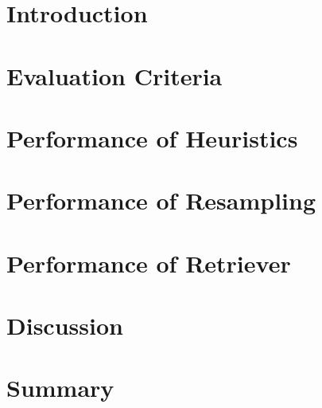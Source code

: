 \section*{Introduction}
\label{sec:evaluation:introduction}



\section{Evaluation Criteria}
\label{sec:evaluation:rqs}



\section{Performance of Heuristics}
\label{sec:evaluation:heuristics}



\section{Performance of Resampling}
\label{sec:evaluation:resampler}



\section{Performance of Retriever}
\label{sec:evaluation:retrieval}



\section{Discussion}
\label{sec:evaluation:discussion}



\section{Summary}
\label{sec:evaluation:summary}



